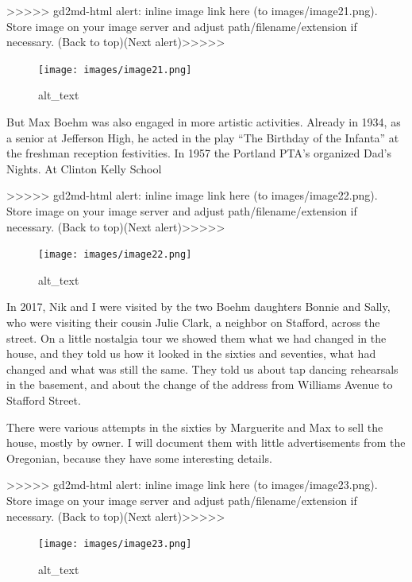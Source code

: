 \documentclass[
  12pt,
]{book}
\begin{document}
{\textgreater\textgreater\textgreater\textgreater\textgreater{} gd2md-html alert: inline image link here (to images/image21.png). Store image on your image server and adjust path/filename/extension if necessary. }(Back to top)(Next alert){\textgreater\textgreater\textgreater\textgreater\textgreater{} }

\begin{figure}
\centering
\texttt{[image: images/image21.png]}
\caption{alt\_text}
\end{figure}

But Max Boehm was also engaged in more artistic activities. Already in 1934, as a senior at Jefferson High, he acted in the play ``The Birthday of the Infanta'' at the freshman reception festivities. In 1957 the Portland PTA's organized Dad's Nights. At Clinton Kelly School

{\textgreater\textgreater\textgreater\textgreater\textgreater{} gd2md-html alert: inline image link here (to images/image22.png). Store image on your image server and adjust path/filename/extension if necessary. }(Back to top)(Next alert){\textgreater\textgreater\textgreater\textgreater\textgreater{} }

\begin{figure}
\centering
\texttt{[image: images/image22.png]}
\caption{alt\_text}
\end{figure}

In 2017, Nik and I were visited by the two Boehm daughters Bonnie and Sally, who were visiting their cousin Julie Clark, a neighbor on Stafford, across the street. On a little nostalgia tour we showed them what we had changed in the house, and they told us how it looked in the sixties and seventies, what had changed and what was still the same. They told us about tap dancing rehearsals in the basement, and about the change of the address from Williams Avenue to Stafford Street.

There were various attempts in the sixties by Marguerite and Max to sell the house, mostly by owner. I will document them with little advertisements from the Oregonian, because they have some interesting details.

{\textgreater\textgreater\textgreater\textgreater\textgreater{} gd2md-html alert: inline image link here (to images/image23.png). Store image on your image server and adjust path/filename/extension if necessary. }(Back to top)(Next alert){\textgreater\textgreater\textgreater\textgreater\textgreater{} }

\begin{figure}
\centering
\texttt{[image: images/image23.png]}
\caption{alt\_text}
\end{figure}
\end{document}
